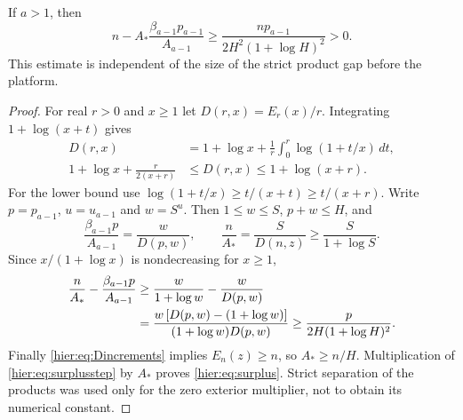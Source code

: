 \begin{lemma}\label{hier:lem:surplus}
If $a>1$, then
\begin{equation}
 n-A_*\frac{\beta_{a-1}p_{a-1}}{A_{a-1}}
 \ge\frac{np_{a-1}}{2H^2(1+\log H)^2}>0.
 \label{hier:eq:surplus}
\end{equation}
This estimate is independent of the size of the strict product gap
before the platform.
\end{lemma}
\begin{proof}
For real $r>0$ and $x\ge1$ let $D(r,x)=E_r(x)/r$. Integrating
$1+\log(x+t)$ gives
\begin{align}
 D(r,x)&=1+\log x+\frac1r\int_0^r\log(1+t/x)\,dt,\\
 1+\log x+\frac{r}{2(x+r)}&\le D(r,x)\le1+\log(x+r).
 \label{hier:eq:Dincrements}
\end{align}
For the lower bound use
$\log(1+t/x)\ge t/(x+t)\ge t/(x+r)$.
Write $p=p_{a-1}$, $u=u_{a-1}$ and $w=S^u$. Then
$1\le w\le S$, $p+w\le H$, and
\[
 \frac{\beta_{a-1}p}{A_{a-1}}=\frac{w}{D(p,w)},
 \qquad \frac n{A_*}=\frac S{D(n,z)}\ge\frac S{1+\log S}.
\]
Since $x/(1+\log x)$ is nondecreasing for $x\ge1$,
\begin{align}
 \frac n{A_*}-\frac{\beta_{a-1}p}{A_{a-1}}
 &\ge\frac w{1+\log w}-\frac w{D(p,w)}\notag\\
 &=\frac{w\,[D(p,w)-(1+\log w)]}
          {(1+\log w)D(p,w)}
 \ge\frac p{2H(1+\log H)^2}. \label{hier:eq:surplusstep}
\end{align}
Finally \eqref{hier:eq:Dincrements} implies $E_n(z)\ge n$, so
$A_*\ge n/H$. Multiplication of \eqref{hier:eq:surplusstep} by $A_*$
proves \eqref{hier:eq:surplus}. Strict separation of the products was used
only for the zero exterior multiplier, not to obtain its numerical
constant.
\end{proof}

